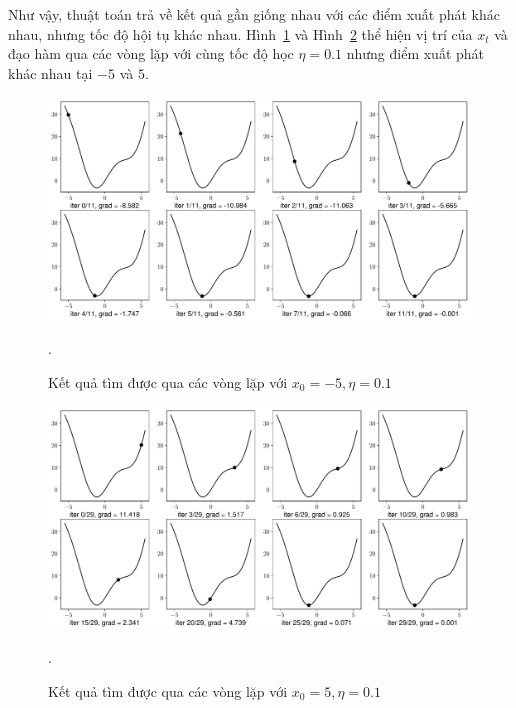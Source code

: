 Như vậy, thuật toán trả về kết quả gần giống nhau với các điểm xuất phát khác
nhau, nhưng tốc độ hội tụ khác nhau. Hình~\ref{fig:7_1} và Hình~\ref{fig:7_2}
thể hiện vị trí của $x_t$ và đạo hàm qua các vòng lặp với cùng tốc độ học $\eta
= 0.1$ nhưng điểm xuất phát khác nhau tại $-5$ và $5$.
 

\begin{figure}[t]
\centering
    \includegraphics[width = \textwidth]{ebookML_src/src/grad_descent/gd1d_0.pdf}
    \caption[]{Kết quả tìm được qua các vòng lặp với $x_0 = -5, \eta = 0.1$}.
    \label{fig:7_1}
\end{figure}

\begin{figure}[t]
\centering
    \includegraphics[width = \textwidth]{ebookML_src/src/grad_descent/gd1d_3.pdf}
    \caption[]{Kết quả tìm được qua các vòng lặp với $x_0 = 5, \eta = 0.1$}.
    \label{fig:7_2}
\end{figure}



